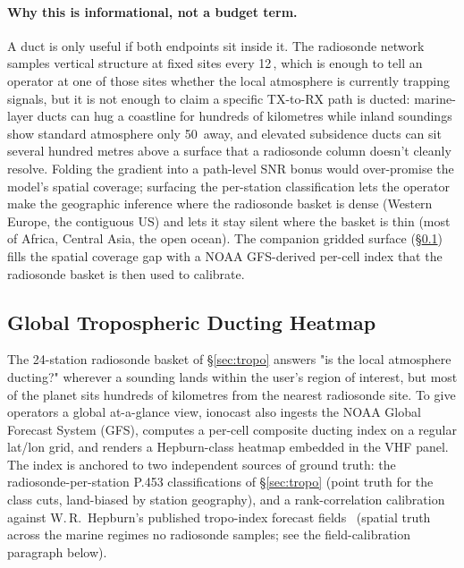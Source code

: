 \documentclass[11pt,a4paper]{article}
\newcommand{\SI}[2]{#1\,\text{#2}}
\newcommand{\km}{\text{km}}
\newcommand{\hour}{\text{h}}
\begin{document}
\paragraph{Why this is informational, not a budget term.} A duct is
only useful if both endpoints sit inside it.  The radiosonde
network samples vertical structure at fixed sites every
\SI{12}{\hour}, which is enough to tell an operator at one of
those sites whether the local atmosphere is currently trapping
signals, but it is not enough to claim a specific TX-to-RX path is
ducted: marine-layer ducts can hug a coastline for hundreds of
kilometres while inland soundings show standard atmosphere only
\SI{50}{\km} away, and elevated subsidence ducts can sit several
hundred metres above a surface that a radiosonde column doesn't
cleanly resolve.  Folding the gradient into a path-level SNR bonus
would over-promise the model's spatial coverage; surfacing the
per-station classification lets the operator make the geographic
inference where the radiosonde basket is dense (Western Europe,
the contiguous US) and lets it stay silent where the basket is
thin (most of Africa, Central Asia, the open ocean).
The companion gridded surface (\S\ref{sec:tropomap}) fills the
spatial coverage gap with a NOAA GFS-derived per-cell index that
the radiosonde basket is then used to calibrate.

\subsection{Global Tropospheric Ducting Heatmap}\label{sec:tropomap}

The 24-station radiosonde basket of \S\ref{sec:tropo} answers
"is the local atmosphere ducting?" wherever a sounding lands within
the user's region of interest, but most of the planet sits hundreds
of kilometres from the nearest radiosonde site. To give operators a
global at-a-glance view, ionocast also ingests the NOAA Global
Forecast System (GFS), computes a per-cell composite ducting index
on a regular lat/lon grid, and renders a Hepburn-class heatmap
embedded in the VHF panel.  The index is anchored to two
independent sources of ground truth: the radiosonde-per-station
P.453 classifications of \S\ref{sec:tropo} (point truth for the
class cuts, land-biased by station geography), and
a rank-correlation calibration against W.\,R.\
Hepburn's published tropo-index forecast
fields~\cite{hepburntropo} (spatial truth across the marine
regimes no radiosonde samples; see the field-calibration
paragraph below).
\end{document}
